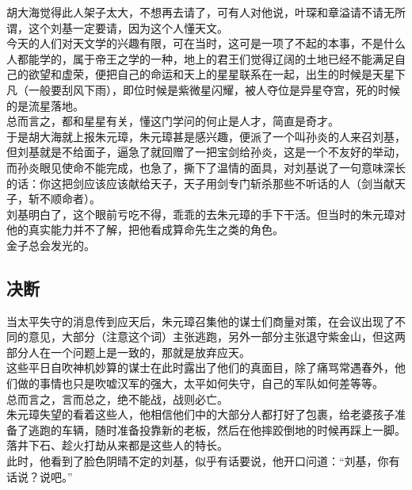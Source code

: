 \begin{multicols}{\theparacolNo}
胡大海觉得此人架子太大，不想再去请了，可有人对他说，叶琛和章溢请不请无所谓，这个刘基一定要请，因为这个人懂天文。\\

今天的人们对天文学的兴趣有限，可在当时，这可是一项了不起的本事，不是什么人都能学的，属于帝王之学的一种，地上的君王们觉得辽阔的土地已经不能满足自己的欲望和虚荣，便把自己的命运和天上的星星联系在一起，出生的时候是天星下凡（一般要刮风下雨），即位时候是紫微星闪耀，被人夺位是异星夺宫，死的时候的是流星落地。\\

总而言之，都和星星有关，懂这门学问的何止是人才，简直是奇才。\\

于是胡大海就上报朱元璋，朱元璋甚是感兴趣，便派了一个叫孙炎的人来召刘基，但刘基就是不给面子，逼急了就回赠了一把宝剑给孙炎，这是一个不友好的举动，而孙炎眼见使命不能完成，也急了，撕下了温情的面具，对刘基说了一句意味深长的话：你这把剑应该应该献给天子，天子用剑专门斩杀那些不听话的人（剑当献天子，斩不顺命者）。\\

刘基明白了，这个眼前亏吃不得，乖乖的去朱元璋的手下干活。但当时的朱元璋对他的真实能力并不了解，把他看成算命先生之类的角色。\\

金子总会发光的。\\

\subsection{决断}
当太平失守的消息传到应天后，朱元璋召集他的谋士们商量对策，在会议出现了不同的意见，大部分（注意这个词）主张逃跑，另外一部分主张退守紫金山，但这两部分人在一个问题上是一致的，那就是放弃应天。\\

这些平日自吹神机妙算的谋士在此时露出了他们的真面目，除了痛骂常遇春外，他们做的事情也只是吹嘘汉军的强大，太平如何失守，自己的军队如何差等等。\\

总而言之，言而总之，绝不能战，战则必亡。\\

朱元璋失望的看着这些人，他相信他们中的大部分人都打好了包裹，给老婆孩子准备了逃跑的车辆，随时准备投靠新的老板，然后在他摔跤倒地的时候再踩上一脚。落井下石、趁火打劫从来都是这些人的特长。\\

此时，他看到了脸色阴晴不定的刘基，似乎有话要说，他开口问道：“刘基，你有话说？说吧。”\\


\end{multicols}
